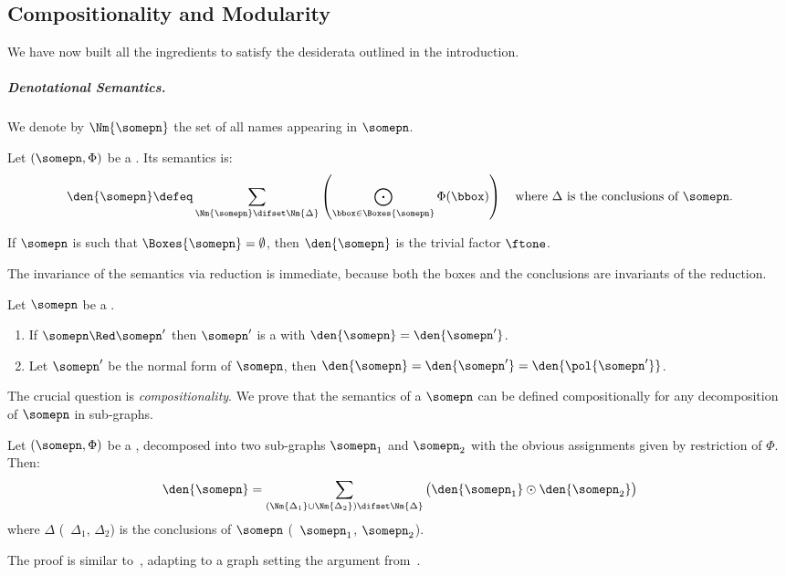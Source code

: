 \subsection{Compositionality and Modularity}
\label{sec:PNcompositionality}

We have now built all the ingredients to satisfy the desiderata outlined in the introduction.

\subparagraph{Denotational Semantics.}

We denote by $\Nm{\somepn}$ the set of all names appearing in $\somepn$.
\begin{definition}
\label{def:sem}
Let $(\somepn,\Phi)$ be a \qbpn.
Its semantics is:
\begin{equation*}
\den{\somepn} \defeq \sum_{\Nm{\somepn}\difset\Nm{\Delta}} \left(\bigodot_{\bbox\in \Boxes{\somepn}} \Phi(\bbox)\right)
\quad\text{where $\Delta$ is the conclusions of $\somepn$.}
\end{equation*}
\end{definition}

\begin{remark}\label{ex:var_ax}
If $\somepn$ is such that $\Boxes{\somepn}=\emptyset$, then $\den{\somepn}$ is the trivial factor $\ftone$.
\end{remark}

The invariance of the semantics via reduction is immediate, because both the boxes and the conclusions are invariants of the reduction.

\begin{proposition}[Invariance]
Let $\somepn$ be a \qpn.
\begin{enumerate}
\item
If $\somepn \Red \somepn'$ then $\somepn'$ is a \qpn with $\den{\somepn}=\den{\somepn'}$.
\item
Let $\somepn'$ be the normal form of $\somepn$, then $\den{\somepn} = \den{\somepn'}= \den {\pol{\somepn'}}$.
\end{enumerate}
\end{proposition}

The crucial question is \emph{compositionality}.
We prove that the semantics of a \qbpn $\somepn$ can be defined compositionally for any decomposition of $\somepn$ in sub-graphs.

\begin{theorem}[Compositionality]
\label{th:compositional}
Let $(\somepn,\Phi)$ be a \qpn, decomposed into two sub-graphs $\somepn_1$ and $\somepn_2$ with the obvious \qCPTs assignments given by restriction of $\Phi$.
Then:
\begin{equation*}
\den{\somepn} = \sum_{(\Nm{\Delta_1} \cup \Nm{\Delta_2})\difset\Nm{\Delta}} \big(\den{\somepn_1} \odot \den{\somepn_2}\big)
\end{equation*}
where $\Delta$ (\resp\ $\Delta_1$, $\Delta_2$) is the conclusions of $\somepn$ (\resp\ $\somepn_1$, $\somepn_2$).
\end{theorem}
The proof is similar to~\cite{BPN}, adapting to a graph setting the argument from~\cite{popl24}.

